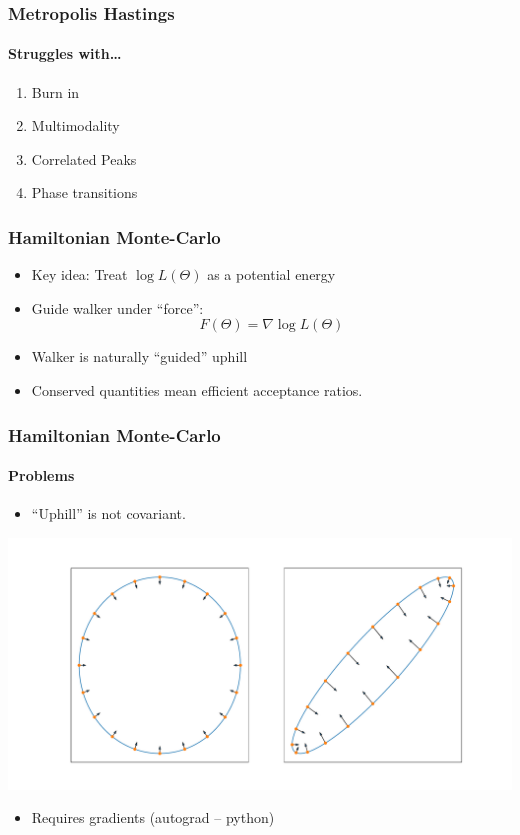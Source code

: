 \documentclass[%
]{beamer}
\begin{document}
\begin{frame}
  \frametitle{Metropolis Hastings} 
  \framesubtitle{Struggles with\ldots}
  \begin{enumerate}
      \pause\item Burn in
      \pause\item Multimodality
      \pause\item Correlated Peaks
      \pause\item Phase transitions
  \end{enumerate}
\end{frame}

\begin{frame}
  \frametitle{Hamiltonian Monte-Carlo} 
  \begin{itemize}
      \pause\item Key idea: Treat $\log L(\Theta)$ as a potential energy
      \pause\item Guide walker under ``force'': \[F(\Theta) =\nabla \log L(\Theta)\]
      \pause\item Walker is naturally ``guided'' uphill
      \pause\item Conserved quantities mean efficient acceptance ratios.
  \end{itemize}
\end{frame}


\begin{frame}
  \frametitle{Hamiltonian Monte-Carlo} 
  \framesubtitle{Problems}
  \pause
  \begin{itemize}
      \item ``Uphill'' is not covariant.
  \end{itemize}
  \pause
  \includegraphics[width=\textwidth]{figures/gradients.pdf}
  \pause
  \begin{itemize}
      \item Requires gradients (autograd -- python)
  \end{itemize}
\end{frame}
\end{document}
